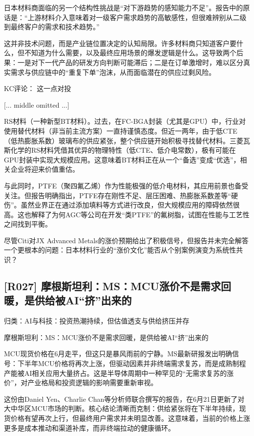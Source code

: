 \documentclass[11pt]{ctexart}
\begin{document}
日本材料商面临的另一个结构性挑战是“对下游趋势的感知能力不足”。报告中的原话是：“上游材料介入意味着对一级客户需求趋势的高敏感性，但很难辨别从二级到最终客户的需求和技术趋势。”

这并非技术问题，而是产业链位置决定的认知局限。许多材料商只知道客户要什么，但不知道为什么需要，以及最终应用场景的爆发逻辑是什么。这导致两个后果：一是对下一代产品的研发方向判断可能滞后；二是在订单激增时，难以区分真实需求与供应链中的“重复下单”泡沫，从而面临潜在的供应过剩风险。

KC评论： 这一点对投

[... middle omitted ...]

RS材料（一种新型BT材料）。过去，在FC-BGA封装（尤其是GPU）中，行业对使用替代材料（非当前主流方案）一直持谨慎态度。但近一两年，由于低CTE（低热膨胀系数）玻璃布的供应紧张，整个供应链开始积极寻找替代材料。三菱瓦斯化学的RS材料凭借其优异的物理特性（低CTE、低介电常数），极有可能在GPU封装中实现大规模应用。这意味着BT材料正在从一个“备选”变成“优选”，相关企业将迎来价值重估。

与此同时，PTFE（聚四氟乙烯）作为性能极强的低介电材料，其应用前景也备受关注。但报告明确指出，PTFE存在刚性不足、层压困难、热膨胀系数差等“硬伤”。虽然业界正在通过添加填料等方式进行改良，但大规模应用的障碍依然很高。这也解释了为何AGC等公司在开发“类PTFE”的氟树脂，试图在性能与工艺性之间找到平衡。

尽管Citi对JX Advanced Metals的涨价预期给出了积极信号，但报告并未完全解答一个更根本的问题：日本材料行业的“涨价文化”能否从个别案例演变为系统性共识？

\subsection{[R027] 摩根斯坦利：MS：MCU涨价不是需求回暖，是供给被AI“挤”出来的}
{\small\color{refgray}归类：AI与科技：投资热潮持续，但估值透支与供给挤压并存}

摩根斯坦利：MS：MCU涨价不是需求回暖，是供给被AI“挤”出来的

MCU现货价格在6月走平，但这只是暴风雨前的宁静。MS最新研报发出明确信号：下半年MCU价格将再次上涨，但驱动因素并非终端需求复苏，而是成熟制程产能被AI相关应用大量挤占。这是半导体周期中一种罕见的“无需求复苏的涨价”，对产业格局和投资逻辑的影响需要重新审视。

这份由Daniel Yen、Charlie Chan等分析师联合撰写的报告，在6月21日更新了对大中华区MCU市场的判断。核心结论清晰而克制：供给紧张将在下半年持续，现货价格有望再次上行，但最终用户需求并未明显改善。这意味着，当前的价格上涨更多是成本推动和渠道补库，而非终端拉动的健康循环。
\end{document}
